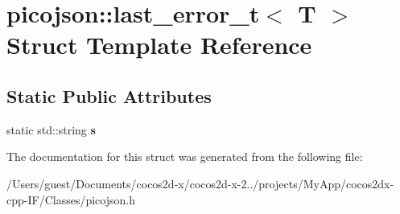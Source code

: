 \hypertarget{structpicojson_1_1last__error__t}{\section{picojson\-:\-:last\-\_\-error\-\_\-t$<$ T $>$ Struct Template Reference}
\label{structpicojson_1_1last__error__t}
}
\subsection*{Static Public Attributes}
\begin{DoxyCompactItemize}
\item 
\hypertarget{structpicojson_1_1last__error__t_a270361f4321424bfd800c36607bf0411}{static std\-::string {\bfseries s}}\label{structpicojson_1_1last__error__t_a270361f4321424bfd800c36607bf0411}

\end{DoxyCompactItemize}


The documentation for this struct was generated from the following file\-:\begin{DoxyCompactItemize}
\item 
/\-Users/guest/\-Documents/cocos2d-\/x/cocos2d-\/x-\/2../projects/\-My\-App/cocos2dx-\/cpp-\/\-I\-F/\-Classes/picojson.\-h\end{DoxyCompactItemize}
